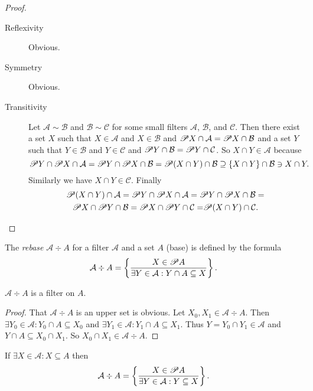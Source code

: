 \begin{proof}
~
\begin{description}
\item [{Reflexivity}] Obvious.
\item [{Symmetry}] Obvious.
\item [{Transitivity}] Let $\mathcal{A}\sim\mathcal{B}$ and $\mathcal{B}\sim\mathcal{C}$
for some small filters $\mathcal{A}$, $\mathcal{B}$, and $\mathcal{C}$.
Then there exist a set $X$ such that $X\in\mathcal{A}$ and $X\in\mathcal{B}$
and $\mathscr{P} X\cap\mathcal{A}=\mathscr{P} X\cap\mathcal{B}$ and a set
$Y$ such that $Y\in\mathcal{B}$ and $Y\in\mathcal{C}$ and $\mathscr{P} Y\cap\mathcal{B}=\mathscr{P} Y\cap\mathcal{C}$.
So $X\cap Y\in\mathcal{A}$ because
\[
\mathscr{P} Y\cap\mathscr{P} X\cap\mathcal{A}=\mathscr{P} Y\cap\mathscr{P} X\cap\mathcal{B}=\mathscr{P}(X\cap Y)\cap\mathcal{B}\supseteq\{X\cap Y\}\cap\mathcal{B}\ni X\cap Y.
\]
Similarly we have $X\cap Y\in\mathcal{C}$. Finally
\begin{multline*}
\mathscr{P}(X\cap Y)\cap\mathcal{A}=\mathscr{P} Y\cap\mathscr{P} X\cap\mathcal{A}=\mathscr{P} Y\cap\mathscr{P} X\cap\mathcal{B}=\\
\mathscr{P} X\cap\mathscr{P} Y\cap\mathcal{B}=\mathscr{P} X\cap\mathscr{P} Y\cap\mathcal{C=}\mathscr{P}(X\cap Y)\cap\mathcal{C}.
\end{multline*}

\end{description}
\end{proof}

\begin{defn}
The \emph{rebase} $\mathcal{A}\div A$ for a
filter $\mathcal{A}$ and a set $A$ (base) is defined by the formula
\[
\mathcal{A}\div A=\left\{ \frac{X\in\mathscr{P} A}{\exists Y\in\mathcal{A}:Y\cap A\subseteq X}\right\}.
\]
\end{defn}

\begin{prop}
$\mathcal{A}\div A$ is a filter on $A$.
\end{prop}

\begin{proof}
That $\mathcal{A}\div A$ is an upper set is obvious. Let $X_0,X_1\in\mathcal{A}\div A$.
Then $\exists Y_0\in\mathcal{A}:Y_0\cap A\subseteq X_0$ and $\exists Y_1\in\mathcal{A}:Y_1\cap A\subseteq X_1$.
Thus $Y=Y_0\cap Y_1\in\mathcal{A}$ and $Y\cap A\subseteq X_0\cap X_1$. So $X_0\cap X_1\in\mathcal{A}\div A$.
\end{proof}

\begin{prop}
If $\exists X\in\mathcal{A}:X\subseteq A$ then
\[
\mathcal{A}\div A=\left\{ \frac{X\in\mathscr{P} A}{\exists Y\in\mathcal{A}:Y\subseteq X}\right\}.
\]
\end{prop}

